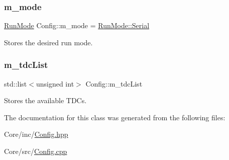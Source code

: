 \subsubsection{\texorpdfstring{m\+\_\+mode}{m\_mode}}
{\footnotesize\ttfamily \hyperlink{_modes_enum_8hpp_a3dfe11cf1a3a8121f6cd7fec4bf5947e}{Run\+Mode} Config\+::m\+\_\+mode = \hyperlink{_modes_enum_8hpp_a3dfe11cf1a3a8121f6cd7fec4bf5947eaab27270f353006b03c91367e05e44b94}{Run\+Mode\+::\+Serial}\hspace{0.3cm}{\ttfamily [private]}}



Stores the desired run mode. 

\mbox{\label{class_config_ac7295451d604cec09ed31ca74411c68c}} 
\subsubsection{\texorpdfstring{m\+\_\+tdc\+List}{m\_tdcList}}
{\footnotesize\ttfamily std\+::list$<$unsigned int$>$ Config\+::m\+\_\+tdc\+List\hspace{0.3cm}{\ttfamily [private]}}



Stores the available T\+D\+Cs. 



The documentation for this class was generated from the following files\+:\begin{DoxyCompactItemize}
\item 
Core/inc/\hyperlink{_config_8hpp}{Config.\+hpp}\item 
Core/src/\hyperlink{_config_8cpp}{Config.\+cpp}\end{DoxyCompactItemize}

